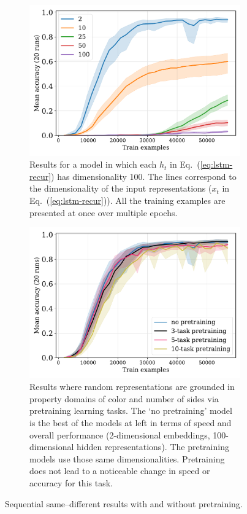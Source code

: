 \documentclass{article}
\newcommand{\eg}[1]{(\ref{#1})}
\newcommand{\update}[1]{{\color{darkblue}#1}}
\begin{document}
\begin{figure}[tp]
  \centering
  \begin{subfigure}[t]{0.48\textwidth}
    \centering
    \includegraphics[width=1\linewidth]{../fig/fuzzy-lm-vocab20-train_size-embed_dim-hidden_dim=100.pdf}
    \caption{Results for a model in which each $h_{t}$ in Eq.~\eg{eq:lstm-recur} has dimensionality 100. The lines correspond to the dimensionality of the input representations ($x_t$ in Eq.~\eg{eq:lstm-recur}). All the training examples are presented at once over multiple epochs.}
    \label{fig:fuzzy-lm-results}
  \end{subfigure}
  \hfill
  \begin{subfigure}[t]{0.48\textwidth}
    \centering
    \includegraphics[width=1\linewidth]{../fig/fuzzy-lm-pretrain-compare-train_size-pretrained-embed_dim=None.pdf}
    \caption{\update{Results where random representations are grounded in property domains of color and number of sides via pretraining learning tasks.  The `no pretraining' model is the best of the models at left in terms of speed and overall performance (2-dimensional embeddings, 100-dimensional hidden representations). The pretraining models use those same dimensionalities. Pretraining does not lead to a noticeable change in speed or accuracy for this task.}}
    \label{fig:fuzzy-lm-pretrain-results}
  \end{subfigure}
  \caption{Sequential same--different results with and without pretraining.}
\end{figure}
\end{document}
